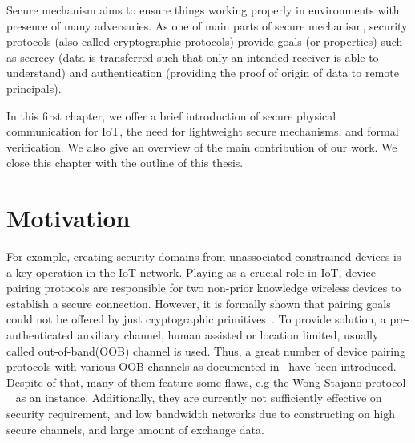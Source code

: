 Secure mechanism aims to ensure things working properly in environments with presence of many adversaries. As one of main parts of secure mechanism, security protocols (also called cryptographic protocols) provide goals (or properties) such as secrecy (data is transferred such that only an intended receiver is able to understand) and authentication (providing the proof of origin of data to remote principals). 

In this first chapter, we offer a brief introduction of secure physical communication for IoT, the need for lightweight secure mechanisms, and formal verification. We also give an overview of the main contribution of our work. We close this chapter with the outline of this thesis. 

\section{Motivation}


For example, creating security domains from unassociated constrained devices is a key operation in the IoT network. Playing as a crucial role in IoT, device pairing protocols are responsible for two non-prior knowledge wireless devices to establish a secure connection. However, it is formally shown that pairing goals could not be offered by just cryptographic primitives~\cite{Burrows90alogic}. To provide solution, a pre-authenticated auxiliary channel, human assisted or location limited, usually called out-of-band(OOB) channel  is used. Thus, a great number of device pairing protocols with various OOB channels as documented in~\cite{6687314} have been introduced. Despite of that, many of them feature some flaws, e.g the Wong-Stajano protocol ~\cite{10.1109/MPRV.2007.76} as an instance. Additionally, they are currently not sufficiently effective on security requirement, and low bandwidth networks due to constructing on high secure channels, and large amount of exchange data. 

